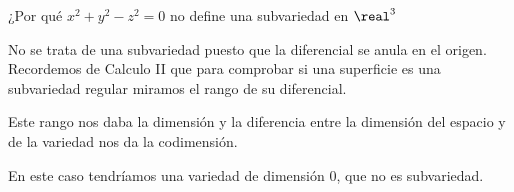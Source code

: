 \begin{problem}[14]
¿Por qué $x^2+y^2-z^2=0$ no define una subvariedad en $\real^3$
\solution


No se trata de una subvariedad puesto que la diferencial se anula en el origen. Recordemos de Calculo II que para comprobar si una superficie es una subvariedad regular miramos el rango de su diferencial.

Este rango nos daba la dimensión y la diferencia entre la dimensión del espacio y de la variedad nos da la codimensión.

En este caso tendríamos una variedad de dimensión 0, que no es subvariedad.

\end{problem}
